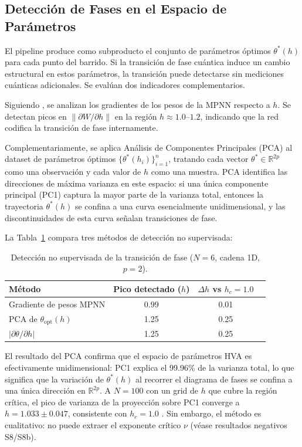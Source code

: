 \documentclass[11pt,a4paper,spanish]{book}
\begin{document}
\subsection{Detección de Fases en el Espacio de Parámetros}

El pipeline produce como subproducto el conjunto de parámetros óptimos $\theta^*(h)$ para cada punto del barrido. Si la transición de fase cuántica induce un cambio estructural en estos parámetros, la transición puede detectarse sin mediciones cuánticas adicionales. Se evalúan dos indicadores complementarios.

Siguiendo \citet{hernandes2025}, se analizan los gradientes de los pesos de la MPNN respecto a $h$. Se detectan picos en $\|\partial W / \partial h\|$ en la región $h \approx 1.0$--$1.2$, indicando que la red codifica la transición de fase internamente.

Complementariamente, se aplica Análisis de Componentes Principales (PCA) al dataset de parámetros óptimos $\{\theta^*(h_i)\}_{i=1}^{n}$, tratando cada vector $\theta^* \in \mathbb{R}^{2p}$ como una observación y cada valor de $h$ como una muestra. PCA identifica las direcciones de máxima varianza en este espacio: si una única componente principal (PC1) captura la mayor parte de la varianza total, entonces la trayectoria $\theta^*(h)$ se confina a una curva esencialmente unidimensional, y las discontinuidades de esta curva señalan transiciones de fase.

La Tabla~\ref{tab:unsupervised_detection} compara tres métodos de detección no supervisada:

\begin{table}[h]
\centering
\caption{Detección no supervisada de la transición de fase ($N = 6$, cadena 1D, $p = 2$).}
\label{tab:unsupervised_detection}
\begin{tabular}{lccc}
\toprule
\textbf{Método} & \textbf{Pico detectado ($h$)} & \textbf{$\Delta h$ vs $h_c = 1.0$} \\
\midrule
Gradiente de pesos MPNN & 0.99 & 0.01 \\
PCA de $\theta_{\text{opt}}(h)$ & 1.25 & 0.25 \\
$|\partial\theta/\partial h|$ & 1.25 & 0.25 \\
\bottomrule
\end{tabular}
\end{table}

El resultado del PCA confirma que el espacio de parámetros HVA es efectivamente unidimensional: PC1 explica el 99.96\% de la varianza total, lo que significa que la variación de $\theta^*(h)$ al recorrer el diagrama de fases se confina a una única dirección en $\mathbb{R}^{2p}$. A $N = 100$ con un grid de $h$ que cubre la región crítica, el pico de varianza de la proyección sobre PC1 converge a $h = 1.033 \pm 0.047$, consistente con $h_c = 1.0$ \citep{dutta2015}. Sin embargo, el método es cualitativo: no puede extraer el exponente crítico $\nu$ (véase resultados negativos S8/S8b).
\end{document}
